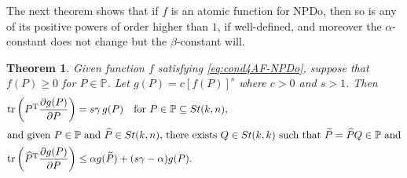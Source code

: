 \documentclass[11pt]{article}
\def\bbP{\mathbb{P}}
\def\bbR{\mathbb{R}}
\def\wtd{\widetilde}
\def\what{\widehat}
\newcommand\STM[2]{{\rm St}(#1,#2)}
\DeclareMathOperator{\tr}{tr}
\DeclareMathOperator{\T}{T}
\newtheorem{theorem}{Theorem}[section]
\theoremstyle{definition}
\newtheorem{remark}{Remark}[section]
\numberwithin{equation}{section}
\begin{document}

The next  theorem shows that if $f$ is an atomic function for NPDo, then so
is any of its positive powers of order higher than $1$, if well-defined, and moreover the $\alpha$-constant does not change but the $\beta$-constant will.

\begin{theorem}\label{thm:cond4set1-pow-induced}
Given function $f$ satisfying \eqref{eq:cond4AF-NPDo}, suppose that $f(P)\ge 0$ for $P\in\bbP$.
Let $g(P)=c[f(P)]^s$ where $c>0$ and $s>1$.
Then
\begin{subequations}\label{eq:cond4set1-pow-induced}
\begin{align}
\tr\left(P^{\T}\frac{\partial g(P)}{\partial P}\right)&=s\gamma\, g(P)\quad\mbox{for $P\in\bbP\subseteq\STM{k}{n}$},
          \label{eq:induced4pow-diff-eq}\\
\intertext{and given $P\in\bbP$ and $\what P\in\STM{k}{n}$, there exists $Q\in\STM{k}{k}$ such
that $\wtd P=\what PQ\in\bbP$ and}
\tr\left(\what P^{\T}\frac{\partial g(P)}{\partial P}\right)
  &\le \alpha g(\wtd P)+(s\gamma-\alpha) g(P). %
          \label{eq:induced-regularity4pow-diff-eq}
\end{align}
\end{subequations}
\end{theorem}
\end{document}
